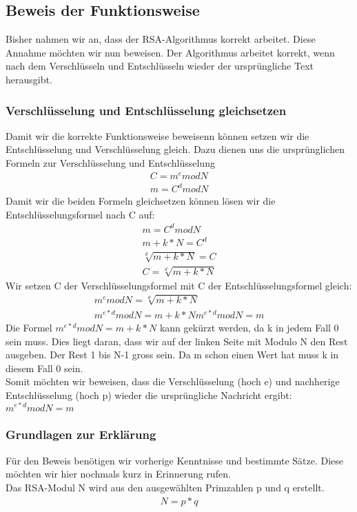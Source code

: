 \subsection{Beweis der Funktionsweise}
Bisher nahmen wir an, dass der RSA-Algorithmus korrekt arbeitet. Diese Annahme möchten wir nun beweisen. Der Algorithmus arbeitet korrekt, wenn nach dem Verschlüsseln und Entschlüsseln wieder der ursprüngliche Text herausgibt. 

\subsubsection{Verschlüsselung und Entschlüsselung gleichsetzen}
Damit wir die korrekte Funktionsweise beweisenn können setzen wir die Entschlüsselung und Verschlüsselung gleich. Dazu dienen uns die ursprünglichen Formeln zur Verschlüsselung und Entschlüsselung \\

\begin{align}
  C = m^e mod N \\
  m = C^d mod N
\end{align}
Damit wir die beiden Formeln gleichsetzen können lösen wir die Entschlüsselungsformel nach C auf:
\begin{align}
  m = C^d mod N \\
  m + k * N = C^d \\
  \sqrt[d]{m+k*N} = C \\
  C = \sqrt[d]{m+k*N}
\end{align}
Wir setzen C der Verschlüsselungsformel mit C der Entschlüsselungsformel gleich:
\begin{align}
  m^e mod N = \sqrt[d]{m+k*N}\\
  m^{e*d} mod N = m + k * N
  m^{e*d} mod N = m
\end{align}
Die Formel $ m^{e*d} mod N = m + k * N $ kann gekürzt werden, da k in jedem Fall 0 sein muss. Dies liegt daran, dass wir auf der linken Seite mit Modulo N den Rest ausgeben. Der Rest 1 bis N-1 gross sein. Da m schon einen Wert hat muss k in diesem Fall 0 sein. \\
Somit möchten wir beweisen, dass die Verschlüsselung (hoch e) und nachherige Entschlüsselung (hoch p) wieder die ursprüngliche Nachricht ergibt:
$ m^{e*d} mod N = m $

\subsubsection{Grundlagen zur Erklärung}
Für den Beweis benötigen wir vorherige Kenntnisse und bestimmte Sätze. Diese möchten wir hier nochmals kurz in Erinnerung rufen.\\ 
Das RSA-Modul N wird aus den ausgewählten Primzahlen p und q erstellt.
\begin{align}
  N = p * q
\end{align}

